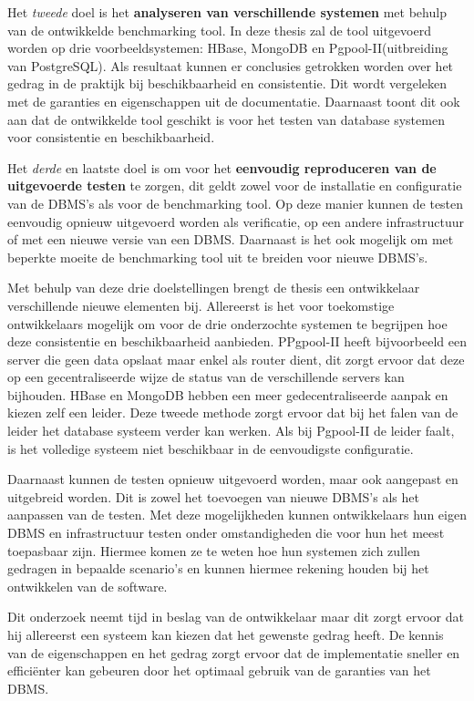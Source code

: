 Het \textit{tweede} doel is het \textbf{analyseren van verschillende systemen} met behulp van de ontwikkelde benchmarking tool. In deze thesis zal de tool uitgevoerd worden op drie voorbeeldsystemen: HBase, MongoDB en Pgpool-II(uitbreiding van PostgreSQL). Als resultaat kunnen er conclusies getrokken worden over het gedrag in de praktijk bij beschikbaarheid en consistentie. Dit wordt vergeleken met de garanties en eigenschappen uit de documentatie. Daarnaast toont dit ook aan dat de ontwikkelde tool geschikt is voor het testen van database systemen voor consistentie en beschikbaarheid. 

Het \textit{derde} en laatste doel is om voor het \textbf{eenvoudig reproduceren van de uitgevoerde testen} te zorgen, dit geldt zowel voor de installatie en configuratie van de DBMS's als voor de benchmarking tool. Op deze manier kunnen de testen eenvoudig opnieuw uitgevoerd worden als verificatie, op een andere infrastructuur of met een nieuwe versie van een DBMS. Daarnaast is het ook mogelijk om met beperkte moeite de benchmarking tool uit te breiden voor nieuwe DBMS's.  

Met behulp van deze drie doelstellingen brengt de thesis een ontwikkelaar verschillende nieuwe elementen bij. Allereerst is het voor toekomstige ontwikkelaars mogelijk om voor de drie onderzochte systemen te begrijpen hoe deze consistentie en beschikbaarheid aanbieden. PPgpool-II heeft bijvoorbeeld een server die geen data opslaat maar enkel als router dient, dit zorgt ervoor dat deze op een gecentraliseerde wijze de status van de verschillende servers kan bijhouden. HBase en MongoDB hebben een meer gedecentraliseerde aanpak en kiezen zelf een leider. Deze tweede methode zorgt ervoor dat bij het falen van de leider het database systeem verder kan werken. Als bij Pgpool-II de leider faalt, is het volledige systeem niet beschikbaar in de eenvoudigste configuratie. 

Daarnaast kunnen de testen opnieuw uitgevoerd worden, maar ook aangepast en uitgebreid worden. Dit is zowel het toevoegen van nieuwe DBMS's als het aanpassen van de testen. Met deze mogelijkheden kunnen ontwikkelaars hun eigen DBMS en infrastructuur testen onder omstandigheden die voor hun het meest toepasbaar zijn. Hiermee komen ze te weten hoe hun systemen zich zullen gedragen in bepaalde scenario's en kunnen hiermee rekening houden bij het ontwikkelen van de software. 

Dit onderzoek neemt tijd in beslag van de ontwikkelaar maar dit zorgt ervoor dat hij allereerst een systeem kan kiezen dat het gewenste gedrag heeft. De kennis van de eigenschappen en het gedrag zorgt ervoor dat de implementatie sneller en efficiënter kan gebeuren door het optimaal gebruik van de garanties van het DBMS. 

